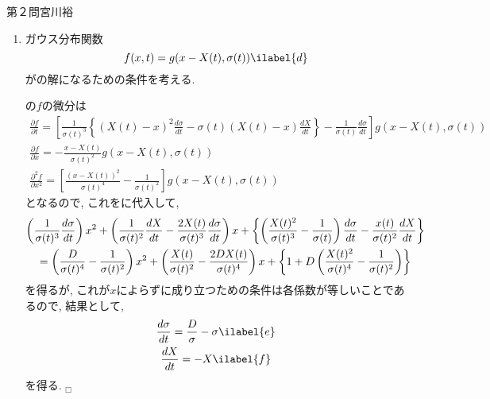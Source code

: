 \documentclass[fleqn]{jbook}
\begin{document}
\begin{answer}{第２問}{宮川裕}
\begin{enumerate}
  計算すると, 
  \begin{gather}
    \frac{\partial g}{\partial x} = -\frac{x}{\sigma^2}g \\
    \frac{\partial^2 g}{\partial x^2} = -\frac{g}{\sigma^2}+\frac{x^2}{\sigma^4}g
  \end{gather}
  であることから, にこれらを代入すると, 
  \begin{align}
    g-\frac{x^2}{\sigma^2}g+D\left[\frac{x^2}{\sigma^4}g-\frac{g}{\sigma^2}\right] &=0 \notag \\
    \Longleftrightarrow  \left(1-\frac{D}{\sigma^2} \right) \left(1-\frac{x^2}{\sigma^2} \right) g &= 0 
  \end{align}
  これが$x$に関わらず成立するので, $1-D/\sigma^2=0$が云える. 
  \begin{align}
    \therefore\quad & \sigma = \sqrt{D} \ _\Box
  \end{align}

\item
  ガウス分布関数
  \begin{equation}
    f(x,t)=g(x-X(t),\sigma(t)) \ilabel{d}
  \end{equation}
  がの解になるための条件を考える. 

  の$f$の微分は
  \begin{gather}
    \frac{\partial f}{\partial t} = \left[\frac{1}{\sigma(t)^3}\left\{(X(t)-x)^2\frac{d \sigma}{dt}-\sigma(t)(X(t)-x)\frac{dX}{dt} \right\}
    -\frac{1}{\sigma(t)}\frac{d\sigma}{dt} \right]g(x-X(t),\sigma(t)) \\
    \frac{\partial f}{\partial x} = - \frac{x-X(t)}{\sigma(t)^2}g(x-X(t),\sigma(t)) \\
    \frac{\partial^2 f}{\partial x^2} = \left[\frac{(x-X(t))^2}{\sigma(t)^4}-\frac{1}{\sigma(t)^2}\right]g(x-X(t),\sigma(t))
  \end{gather} 
  となるので, これをに代入して, 
  \begin{gather}
    \left(\frac{1}{\sigma(t)^3}\frac{d\sigma}{dt}\right)x^2+\left(\frac{1}{\sigma(t)^2}\frac{dX}{dt}-\frac{2X(t)}{\sigma(t)^3}\frac{d\sigma}{dt}\right)x
    +\left\{\left(\frac{X(t)^2}{\sigma(t)^3}-\frac{1}{\sigma(t)}\right)\frac{d\sigma}{dt}-\frac{x(t)}{\sigma(t)^2}\frac{dX}{dt}\right\} \notag \\
    =\left(\frac{D}{\sigma(t)^4}-\frac{1}{\sigma(t)^2}\right)x^2+\left(\frac{X(t)}{\sigma(t)^2}-\frac{2DX(t)}{\sigma(t)^4}\right)x
    +\left\{1+D\left(\frac{X(t)^2}{\sigma(t)^4}-\frac{1}{\sigma(t)^2}\right)\right\}
  \end{gather}
  を得るが, これが$x$によらずに成り立つための条件は各係数が等しいことであるので, 結果として, 
  \begin{gather}
    \frac{d\sigma}{dt} = \frac{D}{\sigma}-\sigma \ilabel{e} \\
    \frac{dX}{dt}=-X \ilabel{f}
  \end{gather}
  を得る. $_\Box$


\end{enumerate}
\end{answer}
\end{document}
